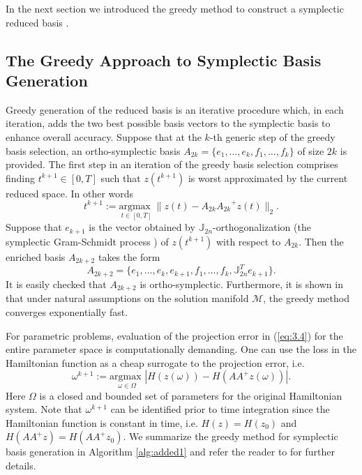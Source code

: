In the next section we introduced the greedy method to construct a symplectic reduced basis \cite{Maboudi:2016}.

\subsection{The Greedy Approach to Symplectic Basis Generation} \label{sec:3.2}
Greedy generation of the reduced basis is an iterative procedure which, in each iteration, adds the two best possible basis vectors to the symplectic basis to enhance overall accuracy. Suppose that at the $k$-th generic step of the greedy basis selection, an ortho-symplectic basis $A_{2k} = \{ e_1,\dots,e_k,f_1,\dots,f_k\}$ of size $2k$ is provided. The first step in an iteration of the greedy basis selection comprises finding $t^{k+1}\in[0,T]$ such that $z(t^{k+1})$ is worst approximated by the current reduced space. In other words
\begin{equation} \label{eq:3.4}
	t^{k+1} := \underset{t\in [0,T]}{\text{argmax }} \| z(t) - A_{2k}{A_{2k}}^+z(t) \|_2.
\end{equation}
Suppose that $e_{k+1}$ is the vector obtained by $\mathbb J_{2n}$-orthogonalization (the symplectic Gram-Schmidt process \cite{Salam2014}) of $z(t^{k+1})$ with respect to $A_{2k}$. Then the enriched basis $A_{2k+2}$ takes the form
\begin{equation}
	A_{2k+2} = \{ e_1,\dots,e_k, e_{k+1},f_1,\dots,f_k,\mathbb J_{2n}^T e_{k+1}\}.
\end{equation}
It is easily checked that $A_{2k+2}$ is ortho-symplectic. Furthermore, it is shown in \cite{Maboudi:2016} that under natural assumptions on the solution manifold $\mathcal M$, the greedy method converges exponentially fast.

For parametric problems, evaluation of the projection error in (\ref{eq:3.4}) for the entire parameter space is computationally demanding. One can use the loss in the Hamiltonian function as a cheap surrogate to the projection error, i.e.
\begin{equation}
	\omega^{k+1} := \underset{\omega\in \Omega}{\text{argmax }} | H(z(\omega)) - H(AA^+z(\omega)) |.
\end{equation}
Here $\Omega$ is a closed and bounded set of parameters for the original Hamiltonian system. Note that $\omega^{k+1}$ can be identified prior to time integration since the Hamiltonian function is constant in time, i.e. $H(z) = H(z_0)$ and $H(AA^+z) = H(AA^+z_0)$. We summarize the greedy method for symplectic basis generation in Algorithm \ref{alg:added1} and refer the reader to \cite{Maboudi:2016} for further details.



